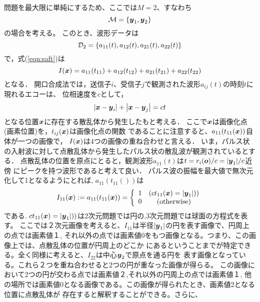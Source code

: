 \documentclass[10pt,a4j,dvipdfmx]{jarticle}
\begin{document}
問題を最大限に単純にするため、ここでは$M=2$、すなわち
\begin{equation}
	{\cal M} =\left\{ 
		\mbox{\boldmath $y$}_1, \mbox{\boldmath $y$}_2
	\right\}
	\label{eqn:M2}
\end{equation}
の場合を考える。
このとき、波形データは
\begin{equation}
	{\cal D}_2=\left\{ a_{11}(t), a_{12}(t), a_{21}(t), a_{22}(t)\right\}
	\label{eqn:}
\end{equation}
で，式(\ref{eqn:saft})は
\begin{equation}
	I(\mbox{\boldmath $x$})=a_{11}(t_{11})+a_{12}(t_{12})+a_{21}(t_{21}) + a_{22}(t_{22})
	\label{eqn:}
\end{equation}
となる．
開口合成法では，送信子$i$、受信子$j$で観測された波形$a_{ij}(t)$の時刻$t$に現れるエコーは、
位相速度を$c$として，
\begin{equation}
	\left| \mbox{\boldmath $x$} -\mbox{\boldmath $y$}_i\right|
	+
	\left| \mbox{\boldmath $x$} -\mbox{\boldmath $y$}_j\right|
	=ct
	\label{eqn:}
\end{equation}
となる位置$\mbox{\boldmath $x$}$に存在する散乱体から発生したもと考える．
ここで$\mbox{\boldmath $x$}$は画像化点(画素位置)を，$t_{ij}(\mbox{\boldmath $x$})$は画像化点の関数
であることに注意すると、$a_{11}(t_{11}(\mbox{\boldmath $x$}))$自体が一つの画像で，
$I(\mbox{\boldmath $x$})$は4つの画像の重ね合わせと言える．
いま，パルス状の入射波に対して点散乱体から発生したパルス状の散乱波が観測されているとする．
点散乱体の位置を原点にとると，観測波形$a_{11}(t)$は$t=r_i(\mbox{\boldmath $o$})/c=|\mbox{\boldmath $y$}_1|/c$近傍
にピークを持つ波形であると考えて良い．
パルス波の振幅を最大値で無次元化して1となるようにとれば,
$a_{11}(t_{11}())$は
\begin{equation}
	I_{11}(\mbox{\boldmath $x$}):=a_{11}(t_{11}(\mbox{\boldmath $x$}))=\left\{
	\begin{array}{cc}
		1 &  (ct_{11}(\mbox{\boldmath $x$})=|\mbox{\boldmath $y$}_1|))\\
		0 &  ({\rm otherwise})
	\end{array}
	\right.
	\label{eqn:}
\end{equation}
である. $ct_{11}(\mbox{\boldmath $x$})=|\mbox{\boldmath $y$}_1|))$は2次元問題では円の,3次元問題では球面の方程式を表す。
ここでは２次元画像を考えると、$I_11$は半径$|\mbox{\boldmath $y$}_1|$の円を表す画像で、円周上の点では画素値１,
それ以外の点では画素値0をもつ画像となる。つまり、この画像上では、点散乱体の位置が円周上のどこか
にあるということまでが特定できる。全く同様に考えると、$I_{22}$は中心$\mbox{\boldmath $y$}_2$で原点を通る円を
表す画像となっている。これら２つを重ね合わせると2つの円が重なった画像が得らる。 
この画像において2つの円が交わる点では画素値２,それ以外の円周上の点では画素値１,
他の場所では画素値0となる画像である。この画像が得られたとき、画素値2となる位置に点散乱体が
存在すると解釈することができる。さらに、
\end{document}
